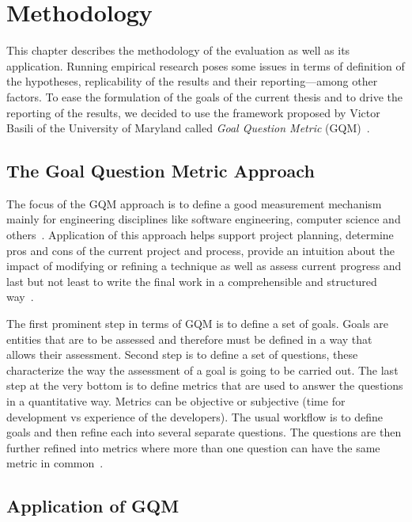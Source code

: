 \chapter{Methodology}
\label{chapter:methodology}

This chapter describes the methodology of the evaluation as well as its application. Running empirical research poses some issues in terms of definition of the hypotheses, replicability of the results and their reporting---among other factors. To ease the formulation of the goals of the current thesis and to drive the reporting of the results, we decided to use the framework proposed by Victor Basili of the University of Maryland called \textit{Goal Question Metric} (GQM)~\cite{basili1992software}.

\section{The Goal Question Metric Approach}

The focus of the GQM approach is to define a good measurement mechanism mainly for engineering disciplines like software engineering, computer science and others~\cite{basili1992software}. Application of this approach helps support project planning, determine pros and cons of the current project and process, provide an intuition about the impact of modifying or refining a technique as well as assess current progress and last but not least to write the final work in a comprehensible and structured way~\cite{basili1992software}.

The first prominent step in terms of GQM is to define a set of goals. Goals are entities that are to be assessed and therefore must be defined in a way that allows their assessment. Second step is to define a set of questions, these characterize the way the assessment of a goal is going to be carried out. The last step at the very bottom is to define metrics that are used to answer the questions in a quantitative way. Metrics can be objective or subjective (time for development vs experience of the developers). The usual workflow is to define goals and then refine each into several separate questions. The questions are then further refined into metrics where more than one question can have the same metric in common~\cite{basili1992software}.

\section{Application of GQM}

